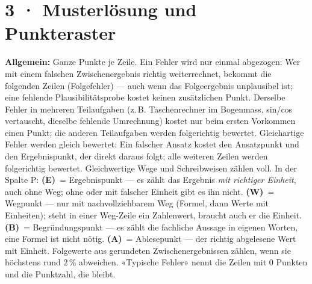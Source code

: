 \documentclass[11pt]{article}
\begin{document}
\section*{3 · Musterlösung und Punkteraster}
\textbf{Allgemein:} Ganze Punkte je Zeile. Ein Fehler wird nur einmal abgezogen: Wer mit einem falschen Zwischenergebnis
richtig weiterrechnet, bekommt die folgenden Zeilen (Folgefehler) — auch wenn das Folgeergebnis unplausibel ist; eine fehlende
Plausibilitätsprobe kostet keinen zusätzlichen Punkt. Derselbe Fehler in mehreren Teilaufgaben (z.\,B. Taschenrechner im Bogenmass,
sin/cos vertauscht, dieselbe fehlende Umrechnung) kostet nur beim ersten Vorkommen einen Punkt; die anderen Teilaufgaben werden folgerichtig
bewertet. Gleichartige Fehler werden gleich bewertet: Ein falscher Ansatz kostet den Ansatzpunkt und den Ergebnispunkt, der direkt daraus folgt;
alle weiteren Zeilen werden folgerichtig bewertet. Gleichwertige Wege und Schreibweisen zählen voll.
In der Spalte P: \textbf{(E)}~= Ergebnispunkt — es zählt das Ergebnis \emph{mit richtiger Einheit}, auch ohne Weg; ohne oder mit
falscher Einheit gibt es ihn nicht. \textbf{(W)}~= Wegpunkt — nur mit nachvollziehbarem Weg (Formel, dann Werte mit Einheiten);
steht in einer Weg-Zeile ein Zahlenwert, braucht auch er die Einheit. \textbf{(B)}~= Begründungspunkt — es zählt die fachliche
Aussage in eigenen Worten, eine Formel ist nicht nötig. \textbf{(A)}~= Ablesepunkt — der richtig abgelesene Wert mit Einheit.
Folgewerte aus gerundeten Zwischenergebnissen zählen, wenn sie höchstens rund 2\,\% abweichen. «Typische Fehler» nennt die Zeilen mit 0 Punkten und die Punktzahl, die bleibt.
\end{document}
